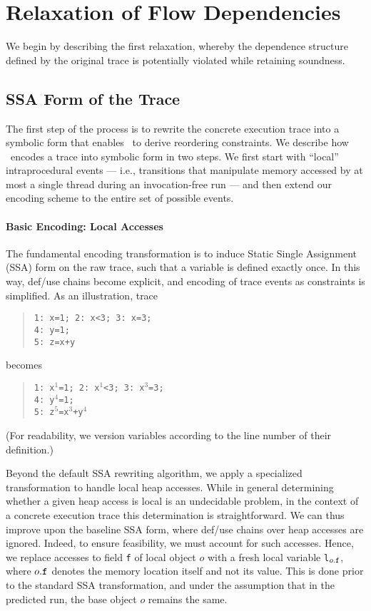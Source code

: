 \section{Relaxation of Flow Dependencies}


We begin by describing the first relaxation, whereby the dependence structure defined by the original trace is potentially violated while retaining soundness.

\subsection{SSA Form of the Trace}

The first step of the process is to rewrite the concrete execution trace into a symbolic form that enables \tool\ to 
derive reordering constraints. We describe how \tool\ encodes a trace into symbolic form in two steps. We first start with ``local'' intraprocedural events --- i.e., 
transitions that manipulate memory accessed by at most a single thread during an invocation-free run --- and then extend our encoding scheme to the entire set of possible events.

\paragraph{Basic Encoding: Local Accesses}

The fundamental encoding transformation is to induce Static Single Assignment (SSA) form on the raw trace, such that
a variable is defined exactly once. In this way, def/use chains become explicit, and encoding of trace events as constraints is simplified. As an illustration, trace
\begin{quote}
	{\tt 1: x=1; 2: x<3; 3: x=3;} \\
	{\tt 4: y=1;} \\
	{\tt 5: z=x+y}
\end{quote}
becomes
\begin{quote}
	{\tt 1: x$^1$=1; 2: x$^1$<3; 3: x$^3$=3;} \\
	{\tt 4: y$^4$=1;} \\
	{\tt 5: z$^5$=x$^3$+y$^4$}
\end{quote}
(For readability, we version variables according to the line number of their definition.)

Beyond the default SSA rewriting algorithm, we apply a specialized transformation to handle local heap accesses. While in general determining whether a given heap access is local is an undecidable problem, in the context
of a concrete execution trace this determination is straightforward. We can thus improve upon the baseline SSA form, where def/use chains over heap accesses are ignored. Indeed, to ensure feasibility, we must account for such accesses. Hence, we replace accesses to field {\tt f} of local object $o$ with a fresh local variable {\tt l$_{o{\tt .f}}$}, where $o{\tt .f}$ denotes the memory location itself and not its value. This is done prior to the standard SSA transformation, and under the assumption that in the predicted run, the base object $o$ remains the same.

